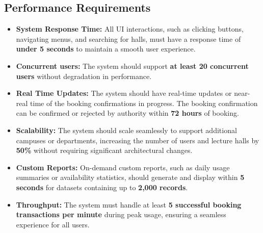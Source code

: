 \documentclass[a4paper,12pt]{article}
\begin{document}
\subsection{Performance Requirements}\label{subsec:performance_reqs}
\begin{itemize}
    \item \textbf{System Response Time:} All UI interactions, such as clicking buttons, navigating menus, and searching for halls, must have a response time of \textbf{under 5 seconds} to maintain a smooth user experience.
    \item \textbf{Concurrent users:} The system should support \textbf{at least 20 concurrent users} without degradation in performance.
    \item \textbf{Real Time Updates:} 
The system should have real-time updates or near-real time of the booking confirmations in progress.
\vspace{-0.2em}
The booking confirmation can be confirmed or rejected by authority within \textbf{72 hours} of booking.
    \item \textbf{Scalability:} The system should scale seamlessly to support additional campuses or departments, increasing the number of users and lecture halls by \textbf{50\%} without requiring significant architectural changes.
    \item \textbf{Custom Reports:} On-demand custom reports, such as daily usage summaries or availability statistics, should generate and display within \textbf{5 seconds} for datasets containing up to \textbf{2,000 records}.
    \item \textbf{Throughput:} The system must handle at least \textbf{5 successful booking transactions per minute} during peak usage, ensuring a seamless experience for all users.

\end{itemize}
\end{document}
